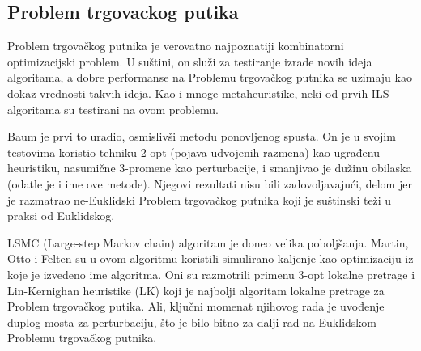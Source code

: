 \documentclass[a4paper]{article}
\begin{document}
\subsection{Problem trgovackog putika}
Problem trgovačkog putnika je verovatno najpoznatiji kombinatorni optimizacijski problem. U suštini, on služi za testiranje izrade novih ideja algoritama, a dobre performanse na Problemu trgovačkog putnika se uzimaju kao dokaz vrednosti takvih ideja. Kao i mnoge metaheuristike, neki od prvih ILS algoritama su testirani na ovom problemu. 

Baum je prvi to uradio, osmislivši metodu ponovljenog spusta. On je u svojim testovima koristio tehniku 2-opt (pojava udvojenih razmena) kao ugrađenu heuristiku, nasumične 3-promene kao perturbacije, i smanjivao je dužinu obilaska (odatle je i ime ove metode). Njegovi rezultati nisu bili zadovoljavajući, delom jer je razmatrao ne-Euklidski Problem trgovačkog putnika koji je suštinski teži u praksi od Euklidskog.

LSMC (Large-step Markov chain) algoritam je doneo velika poboljšanja. Martin, Otto i Felten su u ovom algoritmu koristili simulirano kaljenje kao optimizaciju iz koje je izvedeno ime algoritma. Oni su razmotrili primenu 3-opt lokalne pretrage i Lin-Kernighan heuristike (LK) koji je najbolji algoritam lokalne pretrage za Problem trgovačkog putika. Ali, ključni momenat njihovog rada je uvođenje duplog mosta za perturbaciju, što je bilo bitno za dalji rad na Euklidskom Problemu trgovačkog putnika.
\end{document}

